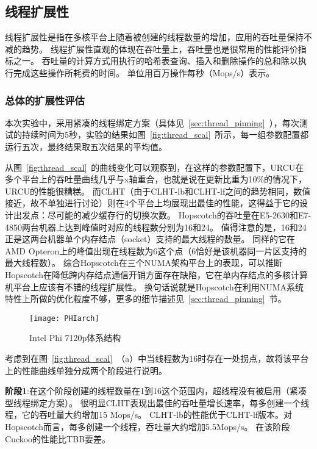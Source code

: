 \subsection{线程扩展性}

线程扩展性是指在多核平台上随着被创建的线程数量的增加，应用的吞吐量保持不减的趋势。
线程扩展性直观的体现在吞吐量上，吞吐量也是很常用的性能评价指标之一。
吞吐量的计算方式用执行的哈希表查询、插入和删除操作的总和除以执行完成这些操作所耗费的时间。
单位用百万操作每秒（Mops/s）表示。

\label{sec:thread_scal}
\subsubsection{总体的扩展性评估}

本次实验中，采用紧凑的线程绑定方案（具体见~\ref{sec:thread_pinning}~），每次测试的持续时间为5秒，实验的结果如图~\ref{fig:thread_scal}~所示，每一组参数配置都运行五次，最终结果取五次结果的平均值。

从图~\ref{fig:thread_scal}~的曲线变化可以观察到，在这样的参数配置下，URCU在多个平台上的吞吐量曲线几乎与x轴重合，也就是说在更新比重为10\%的情况下，URCU的性能很糟糕。
而CLHT（由于CLHT-lb和CLHT-lf之间的趋势相同，数值接近，故不单独进行讨论）则在4个平台上均展现出最佳的性能，这得益于它的设计出发点：尽可能的减少缓存行的切换次数。
Hopscotch的吞吐量在E5-2630和E7-4850两台机器上达到峰值时对应的线程数分别为16和24。
值得注意的是，16和24正是这两台机器单个内存结点（socket）支持的最大线程的数量。
同样的它在AMD Opteron上的峰值出现在线程数为6这个点（6恰好是该机器同一片区支持的最大线程数）。
综合Hopscotch在三个NUMA架构平台上的表现，可以推断Hopscotch在降低跨内存结点通信开销方面存在缺陷，它在单内存结点的多核计算机平台上应该有不错的线程扩展性。
换句话说就是Hopscotch在利用NUMA系统特性上所做的优化粒度不够，更多的细节描述见~\ref{sec:thread_pinning}~节。

\begin{figure}[htbp]
\centering
\texttt{[image: PHIarch]}
\caption{Intel Phi 7120p体系结构}\label{fig:phi_arch}
\end{figure}

考虑到在图~\ref{fig:thread_scal}~（a）中当线程数为16时存在一处拐点，故将该平台上的性能曲线单独分成两个阶段进行说明。

\textbf{阶段1}:在这个阶段创建的线程数量在1到16这个范围内，超线程没有被启用（紧凑型线程绑定方案）。
很明显CLHT表现出最佳的吞吐量增长速率，每多创建一个线程，它的吞吐量大约增加15 Mops/s。
CLHT-lb的性能优于CLHT-lf版本。对Hopscotch而言，每多创建一个线程，吞吐量大约增加5.5Mops/s。 在该阶段Cuckoo的性能比TBB要差。

